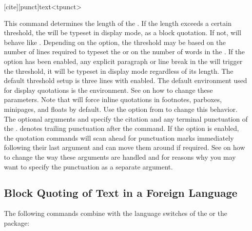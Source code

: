 \documentclass{ltxdockit}[2010/09/26]
\begin{document}
\begin{ltxsyntax}

[cite][punct]{text}<tpunct>

This command determines the length of the . If the length exceeds a certain threshold, the  will be typeset in display mode, \ie as a block quotation. If not,  will behave like . Depending on the  option, the threshold may be based on the number of lines required to typeset the  or on the number of words in the . If the  option has been enabled, any explicit paragraph or line break in the  will trigger the threshold, \ie it will be typeset in display mode regardless of its length. The default threshold setup is three lines with  enabled. The default environment used for display quotations is the  environment. See  on how to change these parameters. Note that  will force inline quotations in footnotes, parboxes, minipages, and floats by default. Use the  option from  to change this behavior. The optional arguments  and  specify the citation and any terminal punctuation of the .  denotes trailing punctuation after the command. If the  option is enabled, the quotation commands will scan ahead for punctuation marks immediately following their last argument and can move them around if required. See  on how to change the way these arguments are handled and  for reasons why you may want to specify the punctuation as a separate argument.

\end{ltxsyntax}

\subsection{Block Quoting of Text in a Foreign Language}
\label{bas:blk:bbl}

The following commands combine  with the language switches of the  or the  package:
\end{document}
